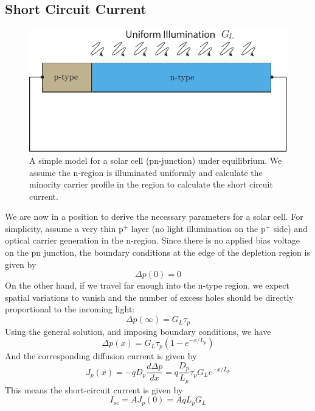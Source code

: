 \subsection{Short Circuit Current}
\begin{figure}[tb]
\centering
\includegraphics[width=.5\columnwidth]{pn_solar_cell}
\caption{A simple model for a solar cell (pn-junction) under equilibrium.  We assume the n-region is illuminated uniformly and calculate the minority carrier profile in the region to calculate the short circuit current.}
\label{fig:pn_solar_cell}
\end{figure}
We are now in a position to derive the necessary parameters for a solar cell.   For simplicity, assume a very thin p$^+$ layer (no light illumination on the p$^+$ side) and optical carrier generation in the n-region.  Since there is no applied bias voltage on the pn junction, the boundary conditions at the edge of the depletion region is given by
    \begin{equation} 
        \Delta p(0) = 0  
    \end{equation}
On the other hand, if we travel far enough into the n-type region, we expect spatial variations to vanish and the number of excess holes should be directly proportional to the incoming light:
    \begin{equation} 
        \Delta p(\infty) = G_L \tau_p  
    \end{equation}
Using the general solution, and imposing boundary conditions, we have 
    \begin{equation} 
        \Delta p(x) = G_L \tau_p \left(1 - e^{-x/L_p} \right)   
    \end{equation}
 And the corresponding diffusion current is given by
    \begin{equation} 
        J_p(x) = - q D_p \frac{d \Delta p}{dx} = q \frac{D_p}{L_p}  \tau_p G_L  e^{-x/L_p}  
    \end{equation}
This means the short-circuit current is given by
    \begin{equation} 
        I_{sc} = A J_p(0) = A q L_p G_L 
    \end{equation}
